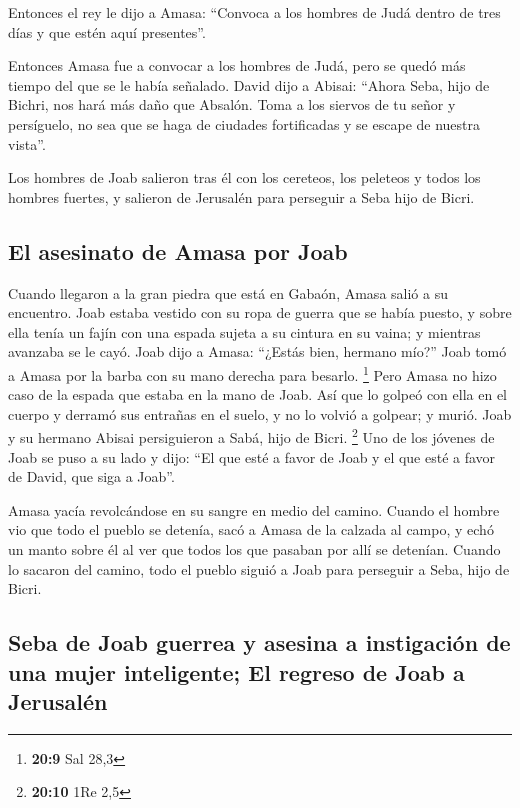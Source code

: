 Entonces el rey le dijo a Amasa: ``Convoca a los hombres
de Judá dentro de tres días y que estén aquí presentes''.

 Entonces Amasa fue a convocar a los hombres de Judá, pero
se quedó más tiempo del que se le había señalado.  David
dijo a Abisai: ``Ahora Seba, hijo de Bichri, nos hará más daño que
Absalón. Toma a los siervos de tu señor y persíguelo, no sea que se haga
de ciudades fortificadas y se escape de nuestra vista''.

 Los hombres de Joab salieron tras él con los cereteos,
los peleteos y todos los hombres fuertes, y salieron de Jerusalén para
perseguir a Seba hijo de Bicri.

\hypertarget{el-asesinato-de-amasa-por-joab}{%
\subsection{El asesinato de Amasa por
Joab}\label{el-asesinato-de-amasa-por-joab}}

 Cuando llegaron a la gran piedra que está en Gabaón,
Amasa salió a su encuentro. Joab estaba vestido con su ropa de guerra
que se había puesto, y sobre ella tenía un fajín con una espada sujeta a
su cintura en su vaina; y mientras avanzaba se le cayó. 
Joab dijo a Amasa: ``¿Estás bien, hermano mío?'' Joab tomó a Amasa por
la barba con su mano derecha para besarlo. \footnote{\textbf{20:9} Sal
  28,3}  Pero Amasa no hizo caso de la espada que estaba
en la mano de Joab. Así que lo golpeó con ella en el cuerpo y derramó
sus entrañas en el suelo, y no lo volvió a golpear; y murió. Joab y su
hermano Abisai persiguieron a Sabá, hijo de Bicri. \footnote{\textbf{20:10}
  1Re 2,5}  Uno de los jóvenes de Joab se puso a su lado
y dijo: ``El que esté a favor de Joab y el que esté a favor de David,
que siga a Joab''.

 Amasa yacía revolcándose en su sangre en medio del
camino. Cuando el hombre vio que todo el pueblo se detenía, sacó a Amasa
de la calzada al campo, y echó un manto sobre él al ver que todos los
que pasaban por allí se detenían.  Cuando lo sacaron del
camino, todo el pueblo siguió a Joab para perseguir a Seba, hijo de
Bicri.

\hypertarget{seba-de-joab-guerrea-y-asesina-a-instigaciuxf3n-de-una-mujer-inteligente-el-regreso-de-joab-a-jerusaluxe9n}{%
\subsection{Seba de Joab guerrea y asesina a instigación de una mujer
inteligente; El regreso de Joab a
Jerusalén}\label{seba-de-joab-guerrea-y-asesina-a-instigaciuxf3n-de-una-mujer-inteligente-el-regreso-de-joab-a-jerusaluxe9n}}

